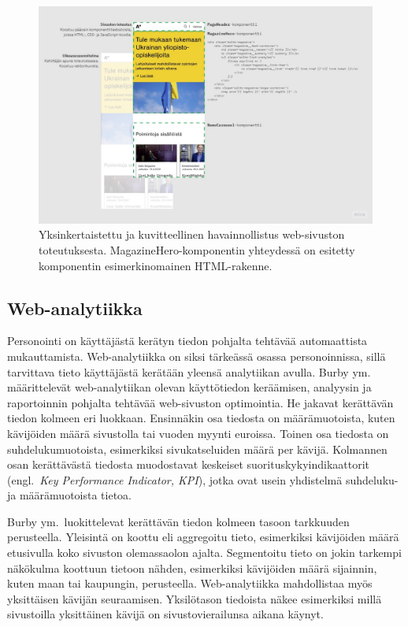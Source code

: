 \documentclass[finnish, 12pt, a4paper, elec, utf8, a-1b, online]{aaltothesis}
\begin{document}
\begin{figure}[h]
    \centering
    \includegraphics[width=\textwidth]{images/website-implementation.jpg}
    \caption{Yksinkertaistettu ja kuvitteellinen havainnollistus web-sivuston~\cite{aalto-website}
    toteutuksesta. MagazineHero-komponentin yhteydessä on esitetty komponentin
    esimerkinomainen HTML-rakenne.~\label{fig:website-implementation}}
\end{figure}

\subsection{Web-analytiikka}

Personointi on käyttäjästä kerätyn tiedon pohjalta tehtävää automaattista
mukauttamista. Web-analytiikka on siksi tärkeässä osassa personoinnissa, sillä
tarvittava tieto käyttäjästä kerätään yleensä analytiikan avulla. Burby
ym.~\cite{burby2007web} määrittelevät web-analytiikan olevan käyttötiedon
keräämisen, analyysin ja raportoinnin pohjalta tehtävää web-sivuston
optimointia. He jakavat kerättävän tiedon kolmeen eri luokkaan. Ensinnäkin osa
tiedosta on määrämuotoista, kuten kävijöiden määrä sivustolla tai vuoden myynti
euroissa. Toinen osa tiedosta on suhdelukumuotoista, esimerkiksi sivukatseluiden
määrä per kävijä. Kolmannen osan kerättävästä tiedosta muodostavat keskeiset
suorituskykyindikaattorit (engl.~\textit{Key Performance Indicator, KPI}), jotka
ovat usein yhdistelmä suhdeluku- ja määrämuotoista tietoa.

Burby ym.~luokittelevat kerättävän tiedon kolmeen tasoon tarkkuuden perusteella.
Yleisintä on koottu eli aggregoitu tieto, esimerkiksi kävijöiden määrä
etusivulla koko sivuston olemassaolon ajalta. Segmentoitu tieto on jokin
tarkempi näkökulma koottuun tietoon nähden, esimerkiksi kävijöiden määrä
sijainnin, kuten maan tai kaupungin, perusteella. Web-analytiikka mahdollistaa
myös yksittäisen kävijän seuraamisen. Yksilötason tiedoista näkee esimerkiksi
millä sivustoilla yksittäinen kävijä on sivustovierailunsa aikana käynyt.
\end{document}
